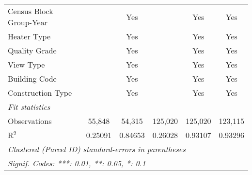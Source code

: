 \begin{table}[htbp]
\begin{tabular}{lccccc}
      Census Block Group-Year               &                 & Yes           &                 & Yes             & Yes\\  
      Heater Type                           &                 & Yes           &                 & Yes             & Yes\\  
      Quality Grade                         &                 & Yes           &                 & Yes             & Yes\\  
      View Type                             &                 & Yes           &                 & Yes             & Yes\\  
      Building Code                         &                 & Yes           &                 & Yes             & Yes\\  
      Construction Type                     &                 & Yes           &                 & Yes             & Yes\\  
      \midrule
      \emph{Fit statistics}\\
      Observations                          & 55,848          & 54,315        & 125,020         & 125,020         & 123,115\\  
      R$^2$                                 & 0.25091         & 0.84653       & 0.26028         & 0.93107         & 0.93296\\  
      \midrule \midrule
      \multicolumn{6}{l}{\emph{Clustered (Parcel ID) standard-errors in parentheses}}\\
      \multicolumn{6}{l}{\emph{Signif. Codes: ***: 0.01, **: 0.05, *: 0.1}}\\
   \end{tabular}
\end{table}
